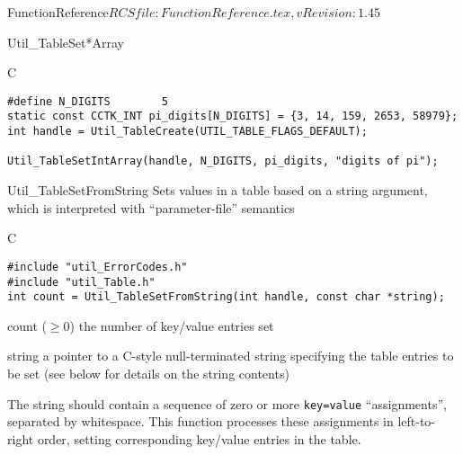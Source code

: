 \begin{cactuspart}{5}{FunctionReference}{$RCSfile: FunctionReference.tex,v $}{$Revision: 1.45 $}
\begin{FunctionDescription}{Util\_TableSet*Array}
\begin{Example}{C}
\begin{verbatim}
#define N_DIGITS        5
static const CCTK_INT pi_digits[N_DIGITS] = {3, 14, 159, 2653, 58979};
int handle = Util_TableCreate(UTIL_TABLE_FLAGS_DEFAULT);

Util_TableSetIntArray(handle, N_DIGITS, pi_digits, "digits of pi");
\end{verbatim}
\end{Example}
\end{FunctionDescription}


\begin{FunctionDescription}{Util\_TableSetFromString}
\label{Util-TableSetFromString}
Sets values in a table based on a string argument, which is interpreted
with ``parameter-file'' semantics

\begin{Synopsis}{C}
\begin{verbatim}
#include "util_ErrorCodes.h"
#include "util_Table.h"
int count = Util_TableSetFromString(int handle, const char *string);
\end{verbatim}
\end{Synopsis}

\begin{Result}{count ($\ge 0$)}
the number of key/value entries set
\end{Result}

\begin{Parameter}{string}
a pointer to a C-style null-terminated string specifying the table
entries to be set (see below for details on the string contents)
\end{Parameter}

\begin{Discussion}
The string should contain a sequence of zero or more \verb|key=value|
``assignments'', separated by whitespace.  This function processes
these assignments in left-to-right order, setting corresponding key/value
entries in the table.\\


\end{Discussion}
\end{FunctionDescription}
\end{cactuspart}
